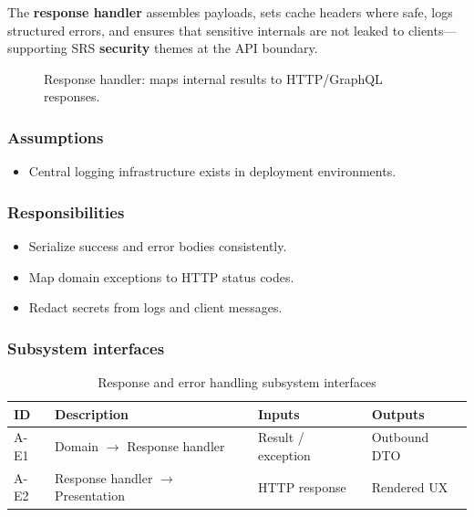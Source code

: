 The \textbf{response handler} assembles payloads, sets cache headers where safe, logs structured errors, and ensures that sensitive internals are not leaked to clients—supporting SRS \textbf{security} themes at the API boundary.

\begin{figure}[H]
\centering
{}
\caption{Response handler: maps internal results to HTTP/GraphQL responses.}
\label{fig:app-resp}
\end{figure}

\subsubsection{Assumptions}
\begin{itemize}
  \item Central logging infrastructure exists in deployment environments.
\end{itemize}

\subsubsection{Responsibilities}
\begin{itemize}
  \item Serialize success and error bodies consistently.
  \item Map domain exceptions to HTTP status codes.
  \item Redact secrets from logs and client messages.
\end{itemize}

\subsubsection{Subsystem interfaces}
\begin{table}[H]
\centering
\small
\begin{tabular}{|p{0.9cm}|p{3.4cm}|p{3.0cm}|p{3.5cm}|}
\hline
\textbf{ID} & \textbf{Description} & \textbf{Inputs} & \textbf{Outputs} \\
\hline
A-E1 & Domain $\rightarrow$ Response handler & Result / exception & Outbound DTO \\
\hline
A-E2 & Response handler $\rightarrow$ Presentation & HTTP response & Rendered UX \\
\hline
\end{tabular}
\caption{Response and error handling subsystem interfaces}
\end{table}

